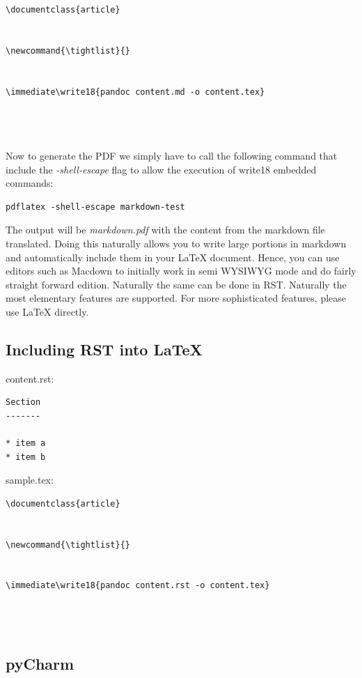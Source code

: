 \begin{verbatim}
\documentclass{article}


\newcommand{\tightlist}{}


\immediate\write18{pandoc content.md -o content.tex}




\end{verbatim}

Now to generate the PDF we simply have to call the following command
that include the {\em -shell-escape} flag to allow the execution of
write18 embedded commands:

\begin{verbatim}
pdflatex -shell-escape markdown-test
\end{verbatim}

The output will be {\em markdown.pdf} with the content from the
markdown file translated. Doing this naturally allows you to write
large portions in markdown and automatically include them in your
LaTeX document. Hence, you can use editors such as Macdown to initially
work in semi WYSIWYG mode and do fairly straight forward
edition. Naturally the same can be done in RST. Naturally the most
elementary features are supported. For more sophisticated features,
please use LaTeX directly.


\subsection{Including RST into LaTeX}

content.rst:

\begin{verbatim}
Section
-------

* item a
* item b
\end{verbatim}

sample.tex:

\begin{verbatim}
\documentclass{article}


\newcommand{\tightlist}{}


\immediate\write18{pandoc content.rst -o content.tex}




\end{verbatim}


\subsection{pyCharm}


